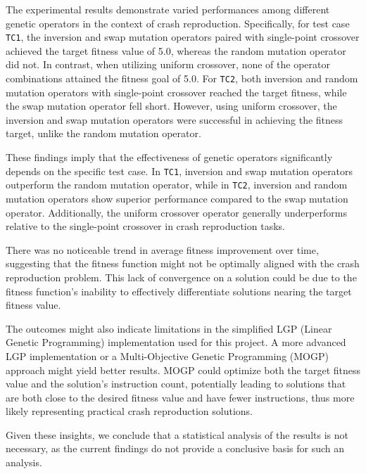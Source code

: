     The experimental results demonstrate varied performances among different genetic operators in the context of crash 
    reproduction. Specifically, for test case \texttt{TC1}, the inversion and swap mutation operators paired with 
    single-point crossover achieved the target fitness value of 5.0, whereas the random mutation operator did not. In 
    contrast, when utilizing uniform crossover, none of the operator combinations attained the fitness goal of 5.0. For 
    \texttt{TC2}, both inversion and random mutation operators with single-point crossover reached the target fitness, 
    while the swap mutation operator fell short. However, using uniform crossover, the inversion and swap mutation 
    operators were successful in achieving the fitness target, unlike the random mutation operator.

    These findings imply that the effectiveness of genetic operators significantly depends on the specific test case. In 
    \texttt{TC1}, inversion and swap mutation operators outperform the random mutation operator, while in \texttt{TC2}, 
    inversion and random mutation operators show superior performance compared to the swap mutation operator. 
    Additionally, the uniform crossover operator generally underperforms relative to the single-point crossover in crash 
    reproduction tasks.

    There was no noticeable trend in average fitness improvement over time, suggesting that the fitness function might 
    not be optimally aligned with the crash reproduction problem. This lack of convergence on a solution could be due to 
    the fitness function's inability to effectively differentiate solutions nearing the target fitness value.

    The outcomes might also indicate limitations in the simplified LGP (Linear Genetic Programming) implementation used 
    for this project. A more advanced LGP implementation or a Multi-Objective Genetic Programming (MOGP) approach might 
    yield better results. MOGP could optimize both the target fitness value and the solution's instruction count, 
    potentially leading to solutions that are both close to the desired fitness value and have fewer instructions, thus 
    more likely representing practical crash reproduction solutions.

    Given these insights, we conclude that a statistical analysis of the results is not necessary, as the current 
    findings do not provide a conclusive basis for such an analysis.
